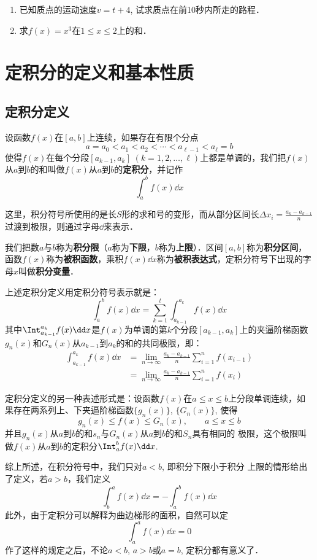 \begin{ex}
\begin{enumerate}
    \item 已知质点的运动速度$v=t+4$, 试求质点在前10秒内所走的路程．
    \item 求$f(x)=x^3$在$1\le x\le 2$上的和．
\end{enumerate}
\end{ex}


\section{定积分的定义和基本性质}
\subsection{定积分定义}

设函数$f(x)$在$[a,b]$上连续，如果存在有限个分点
\[a=a_0<a_1<a_2<\cdots<a_{\ell-1}<a_{\ell}=b\]
使得$f(x)$在每个分段$[a_{k-1},a_k]\; (k=1, 2,\ldots,\ell)$上都是单调的，我们把$f(x)$从$a$到$b$的和叫做$f(x)$从$a$到$b$的\textbf{定积分}，并记作
\[\int^b_a f(x) \dd x\]

这里，积分符号所使用的是长$S$形的求和号的变形，而从部分区间长$\Delta x_i=\frac{a_k-a_{k-1}}{n}$过渡到极限，则通过字母$\dd$来表示．

我们把数$a$与$b$称为\textbf{积分限}（$a$称为\textbf{下限}，$b$称为\textbf{上限}）．区间$[a,b]$称为\textbf{积分区间}，函数$f(x)$称为\textbf{被积函数}，乘积$f(x)\dd x$称为\textbf{被积表达式}，定积分符号下出现的字母$x$叫做\textbf{积分变量}．

上述定积分定义用定积分符号表示就是：
\[\int^b_a f(x) \dd x=\sum^t_{k=1}\int^{a_k}_{a_{k-1}}f(x)\dd x\]
其中$\Int^{a_k}_{a_{k-1}}f(x)\dd x$是$f(x)$为单调的第$k$个分段$[a_{k-1},a_k]$上的夹逼阶梯函数$g_n(x)$和$G_n(x)$从$a_{k-1}$到$a_k$的和的共同极限，即：
\begin{align*}
    \int^{a_k}_{a_{k-1}}f(x)\dd x&=\lim_{n\to \infty}\frac{a_k-a_{k-1}}{n}\sum^n_{i=1}f(x_{i-1})\\
    &=\lim_{n\to \infty}\frac{a_k-a_{k-1}}{n}\sum^n_{i=1}f(x_{i})
\end{align*}

定积分定义的另一种表述形式是：设函数$f(x)$在$a\le x\le b$上分段单调连续，如果存在两系列上、下夹逼阶梯函数$\{g_n(x)\}$, $\{G_n(x)\}$, 使得
\[g_n (x)\le f(x)\le G_n(x),\qquad a\le x\le b\]
并且$g_n(x)$从$a$到$b$的和$s_n$与$G_n(x)$从$a$到$b$的和$S_n$具有相同的
极限，这个极限叫做$f(x)$从$a$到$b$的定积分$\Int^b_a f(x) \dd x$.

综上所述，在积分符号中，我们只对$a<b$, 即积分下限小于积分
上限的情形给出了定义，若$a>b$，我们定义
\[\int^a_b f(x) \dd x=-\int^b_a f(x) \dd x\]
此外，由于定积分可以解释为曲边梯形的面积，自然可以定
\[\int^a_a f(x) \dd x=0\]
作了这样的规定之后，不论$a<b$, $a>b$或$a=b$, 定积分都有意义了．


